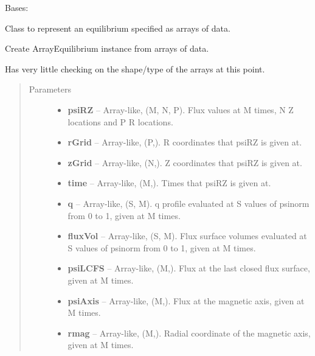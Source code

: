 \documentclass[letterpaper,10pt,english]{sphinxmanual}
\begin{document}
\begin{fulllineitems}
\label{eqtools:eqtools.FromArrays.ArrayEquilibrium}
Bases: {\hyperref[eqtools:eqtools.core.Equilibrium]{}}

Class to represent an equilibrium specified as arrays of data.

Create ArrayEquilibrium instance from arrays of data.

Has very little checking on the shape/type of the arrays at this point.
\begin{quote}\begin{description}
\item[{Parameters}] \leavevmode\begin{itemize}
\item {} 
\textbf{psiRZ} --
Array-like, (M, N, P).
Flux values at M times, N Z locations and P R locations.

\item {} 
\textbf{rGrid} --
Array-like, (P,).
R coordinates that psiRZ is given at.

\item {} 
\textbf{zGrid} --
Array-like, (N,).
Z coordinates that psiRZ is given at.

\item {} 
\textbf{time} --
Array-like, (M,).
Times that psiRZ is given at.

\item {} 
\textbf{q} --
Array-like, (S, M).
q profile evaluated at S values of psinorm from 0 to 1, given at M
times.

\item {} 
\textbf{fluxVol} --
Array-like, (S, M).
Flux surface volumes evaluated at S values of psinorm from 0 to 1,
given at M times.

\item {} 
\textbf{psiLCFS} --
Array-like, (M,).
Flux at the last closed flux surface, given at M times.

\item {} 
\textbf{psiAxis} --
Array-like, (M,).
Flux at the magnetic axis, given at M times.

\item {} 
\textbf{rmag} --
Array-like, (M,).
Radial coordinate of the magnetic axis, given at M times.


\end{itemize}
\end{description}
\end{quote}
\end{fulllineitems}
\end{document}
